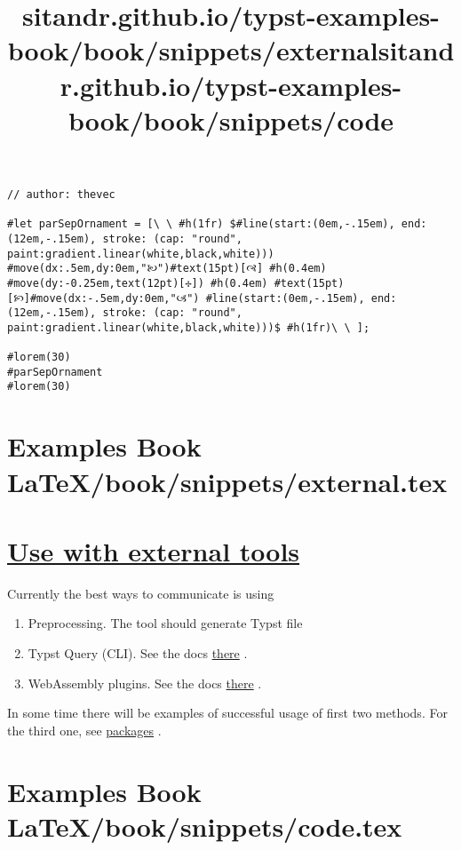 \begin{verbatim}
// author: thevec

#let parSepOrnament = [\ \ #h(1fr) $#line(start:(0em,-.15em), end:(12em,-.15em), stroke: (cap: "round", paint:gradient.linear(white,black,white))) #move(dx:.5em,dy:0em,"🙠")#text(15pt)[🙣] #h(0.4em) #move(dy:-0.25em,text(12pt)[✢]) #h(0.4em) #text(15pt)[🙡]#move(dx:-.5em,dy:0em,"🙢") #line(start:(0em,-.15em), end:(12em,-.15em), stroke: (cap: "round", paint:gradient.linear(white,black,white)))$ #h(1fr)\ \ ];

#lorem(30)
#parSepOrnament
#lorem(30)
\end{verbatim}

\pandocbounded{}


\section{Examples Book LaTeX/book/snippets/external.tex}
\title{sitandr.github.io/typst-examples-book/book/snippets/external}

\section{\texorpdfstring{\hyperref[use-with-external-tools]{Use with
external
tools}}{Use with external tools}}\label{use-with-external-tools}

Currently the best ways to communicate is using

\begin{enumerate}
\tightlist
\item
  Preprocessing. The tool should generate Typst file
\item
  Typst Query (CLI). See the docs
  \href{https://typst.app/docs/reference/meta/query\#command-line-queries}{there}
  .
\item
  WebAssembly plugins. See the docs
  \href{https://typst.app/docs/reference/foundations/plugin/}{there} .
\end{enumerate}

In some time there will be examples of successful usage of first two
methods. For the third one, see \href{../packages/index.html}{packages}
.


\section{Examples Book LaTeX/book/snippets/code.tex}
\title{sitandr.github.io/typst-examples-book/book/snippets/code}


